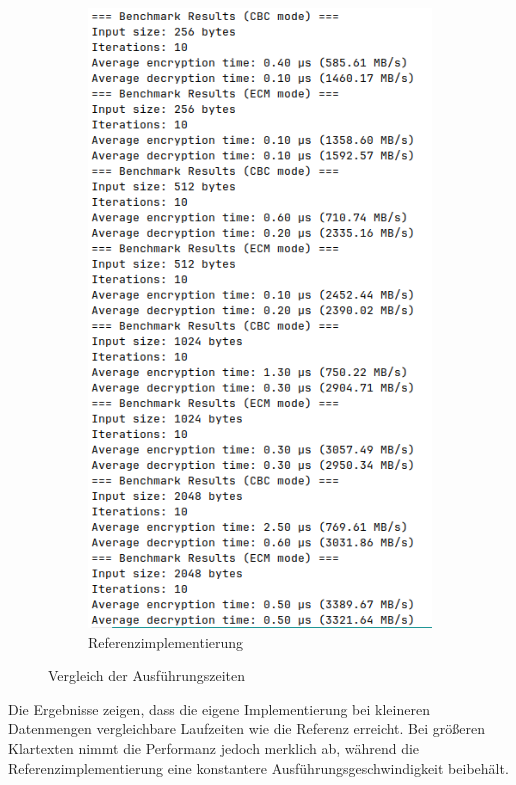 \begin{figure}[h]
\begin{subfigure}[b]{0.49\textwidth}
        \label{fig:bench_my}
    \end{subfigure}
    \hfill
    \begin{subfigure}[b]{0.49\textwidth}
        \centering
        \includegraphics[width=\textwidth]{img/bench/referencebench.png}
        \caption{Referenzimplementierung}
        \label{fig:bench_ref}
    \end{subfigure}
    \caption{Vergleich der Ausführungszeiten}
    \label{fig:benchmark}
\end{figure}
Die Ergebnisse zeigen, dass die eigene Implementierung bei kleineren Datenmengen vergleichbare Laufzeiten wie die Referenz erreicht. Bei größeren Klartexten nimmt die Performanz jedoch merklich ab, während die Referenzimplementierung eine konstantere Ausführungsgeschwindigkeit beibehält.